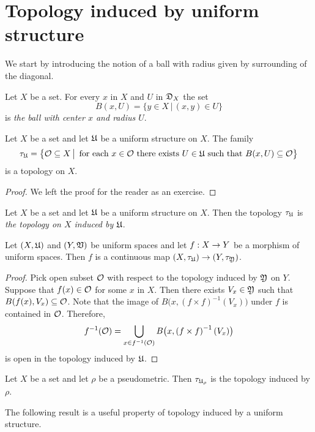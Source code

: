 \section{Topology induced by uniform structure}
\noindent
We start by introducing the notion of a ball with radius given by surrounding of the diagonal.

\begin{definition}
Let $X$ be a set. For every $x$ in $X$ and $U$ in ${\mathfrak D}_X$ the set
$$B(x,U) = \big\{y\in X\,\big|\,(x,y)\in U\big\}$$
is \textit{the ball with center $x$ and radius $U$}.
\end{definition}

\begin{fact}\label{fact:topology_induced_by_uniform_structure}
Let $X$ be a set and let ${\mathfrak U}$ be a uniform structure on $X$. The family
$$\tau_{{\mathfrak U}} = \big\{{\mathcal O}\subseteq X\,\big|\,\mbox{ for each }x\in {\mathcal O}\mbox{ there exists }U\in {\mathfrak U}\mbox{ such that }B(x,U)\subseteq {\mathcal O}\big\}$$
is a topology on $X$.
\end{fact}
\begin{proof}
We left the proof for the reader as an exercise.
\end{proof}

\begin{definition}
Let $X$ be a set and let ${\mathfrak U}$ be a uniform structure on $X$. Then the topology $\tau_{{\mathfrak U}}$ is \textit{the topology on $X$ induced by ${\mathfrak U}$}.
\end{definition}

\begin{fact}\label{fact:uniform_morphism_is_a_continuous_map}
Let $(X,{\mathfrak U})$ and $(Y,{\mathfrak V})$ be uniform spaces and let $f:X\rightarrow Y$ be a morphism of uniform spaces. Then $f$ is a continuous map $\left(X,\tau_{{\mathfrak U}}\right)\rightarrow \left(Y,\tau_{{\mathfrak Y}}\right)$.
\end{fact}
\begin{proof}
Pick open subset ${\mathcal O}$ with respect to the topology induced by ${\mathfrak Y}$ on $Y$. Suppose that $f(x) \in {\mathcal O}$ for some $x$ in $X$. Then there exists $V_x \in {\mathfrak Y}$ such that $B(f(x),V_x)\subseteq {\mathcal O}$. Note that the image of $B\big(x,\left(f\times f\right)^{-1}(V_x)\big)$ under $f$ is contained in ${\mathcal O}$. Therefore,
$$f^{-1}({\mathcal O}) = \bigcup_{x\in f^{-1}({\mathcal O})}B\big(x,\left(f\times f\right)^{-1}(V_x)\big)$$
is open in the topology induced by ${\mathfrak U}$.
\end{proof}

\begin{remark}\label{remark:topology_induced_by_uniform_structure_for_pseudometric_coincides_with_topology_induced_by_pseudometric}
Let $X$ be a set and let $\rho$ be a pseudometric. Then $\tau_{{\mathfrak U}_{\rho}}$ is the topology induced by $\rho$.
\end{remark}
\noindent
The following result is a useful property of topology induced by a uniform structure. 


